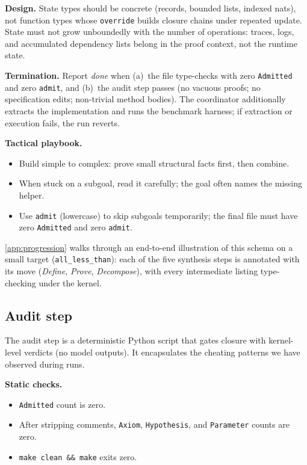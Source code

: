 {\textbf{Design.} State types should be concrete (records, bounded lists, indexed nats), not function types whose \texttt{override} builds closure chains under repeated update. State must not grow unboundedly with the number of operations: traces, logs, and accumulated dependency lists belong in the proof context, not the runtime state.

\textbf{Termination.} Report \emph{done} when (a)~the file type-checks with zero \texttt{Admitted} and zero \texttt{admit}, and (b)~the audit step passes (no vacuous proofs; no specification edits; non-trivial method bodies). The coordinator additionally extracts the implementation and runs the benchmark harness; if extraction or execution fails, the run reverts.

\textbf{Tactical playbook.}
\begin{itemize}[leftmargin=1.4em,itemsep=1pt,topsep=1pt]
\item Build simple to complex: prove small structural facts first, then combine.
\item When stuck on a subgoal, read it carefully; the goal often names the missing helper.
\item Use \texttt{admit} (lowercase) to skip subgoals temporarily; the final file must have zero \texttt{Admitted} and zero \texttt{admit}.
\end{itemize}
}

\cref{app:progression} walks through an end-to-end illustration of this schema on a small target (\texttt{all\_less\_than}): each of the five synthesis steps is annotated with its move (\emph{Define}, \emph{Prove}, \emph{Decompose}), with every intermediate listing type-checking under the kernel.

\subsection{Audit step}
\label{app:auditor}

The audit step is a deterministic Python script that gates closure with kernel-level verdicts (no model outputs). It encapsulates the cheating patterns we have observed during runs.

\textbf{Static checks.}
\begin{itemize}[leftmargin=*,itemsep=2pt,topsep=2pt]
\item \texttt{Admitted} count is zero.
\item After stripping comments, \texttt{Axiom}, \texttt{Hypothesis}, and \texttt{Parameter} counts are zero.
\item \texttt{make clean \&\& make} exits zero.
\end{itemize}

